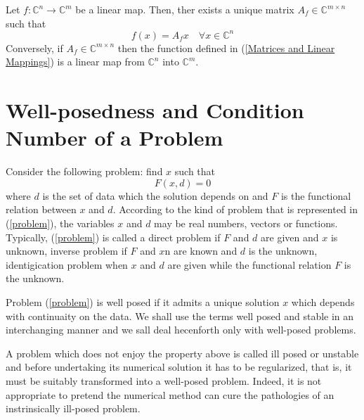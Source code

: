 \begin{property}
    Let $f: \mathbb{C}^n \rightarrow \mathbb{C}^m$ be a linear map. Then, ther exists a unique matrix $A_f \in \mathbb{C}^{m \times n}$ such that
    \begin{equation}
        f(x) = A_f x \quad \forall x \in \mathbb{C}^n
        \label{Matrices and Linear Mappings}
    \end{equation}
    Conversely, if $A_f \in \mathbb{C}^{m \times n}$ then the function defined in (\ref{Matrices and Linear Mappings}) is a linear map from $\mathbb{C}^n$ into $\mathbb{C}^m$.
\end{property}

\section{Well-posedness and Condition Number of a Problem}
Consider the following problem: find $x$ such that
\begin{equation}
    F(x, d) = 0
    \label{problem}
\end{equation}
where $d$ is the set of data which the solution depends on and $F$ is the functional relation between $x$ and $d$. According to the kind of problem that is represented in (\ref{problem}), the variables $x$ and $d$ may be real numbers, vectors or functions. Typically, (\ref{problem}) is called a direct problem if $F$ and $d$ are given and $x$ is unknown, inverse problem if $F$ and $x$n are known and $d$ is the unknown, identigication problem when $x$ and $d$ are given while the functional relation $F$ is the unknown.

Problem (\ref{problem}) is well posed if it admits a unique solution $x$ which depends with continuaity on the data. We shall use the terms well posed and stable in an interchanging manner and we sall deal hecenforth only with well-posed problems.

A problem which does not enjoy the property above is called ill posed or unstable and before undertaking its numerical solution it has to be regularized, that is, it must be suitably transformed into a well-posed problem. Indeed, it is not appropriate to pretend the numerical method can cure the pathologies of an instrinsically ill-posed problem.

